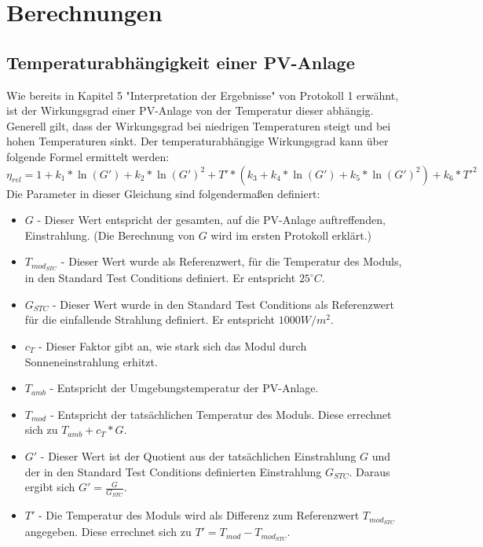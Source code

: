 \documentclass[a4paper,12pt]{article}
\begin{document}
	\section{Berechnungen}
	\subsection{Temperaturabhängigkeit einer PV-Anlage}
	Wie bereits in Kapitel 5 "Interpretation der Ergebnisse" von Protokoll 1 erwähnt, ist der Wirkungsgrad einer PV-Anlage von der Temperatur dieser abhängig. Generell gilt, dass der Wirkungsgrad bei niedrigen Temperaturen steigt und bei hohen Temperaturen sinkt.\newline
	Der temperaturabhängige Wirkungsgrad kann über folgende Formel ermittelt werden:
	\begin{equation}
	\eta_{rel}=1+k_1*\ln{(G')}+k_2*\ln{(G')}^2+T'*(k_3+k_4*\ln{(G')}+k_5*\ln{(G')}^2)+k_6*T'^2
	\end{equation}
	Die Parameter in dieser Gleichung sind folgendermaßen definiert:
	\begin{itemize}
		\item \textbf{$G$} - Dieser Wert entspricht der gesamten, auf die PV-Anlage auftreffenden, Einstrahlung. (Die Berechnung von $G$ wird im ersten Protokoll erklärt.)
		\item \textbf{$T_{mod_{STC}}$} - Dieser Wert wurde als Referenzwert, für die Temperatur des Moduls, in den Standard Test Conditions definiert. Er entspricht $25^{\circ}C$.
		\item \textbf{$G_{STC}$} - Dieser Wert wurde in den Standard Test Conditions als Referenzwert für die einfallende Strahlung definiert. Er entspricht $1000W/m^2$.
		\item \textbf{$c_T$} - Dieser Faktor gibt an, wie stark sich das Modul durch Sonneneinstrahlung erhitzt.
		\item \textbf{$T_{amb}$} - Entspricht der Umgebungstemperatur der PV-Anlage.
		\item \textbf{$T_{mod}$} - Entspricht der tatsächlichen Temperatur des Moduls. Diese errechnet sich zu $T_{amb}+c_T*G$.
		\item \textbf{$G'$} - Dieser Wert ist der Quotient aus der tatsächlichen Einstrahlung $G$ und der in den Standard Test Conditions definierten Einstrahlung $G_{STC}$. Daraus ergibt sich $G'=\frac{G}{G_{STC}}$.
		\item \textbf{$T'$} - Die Temperatur des Moduls wird als Differenz zum Referenzwert $T_{mod_{STC}}$ angegeben. Diese errechnet sich zu $T'=T_{mod}-T_{mod_{STC}}$.
	\end{itemize}
\end{document}

